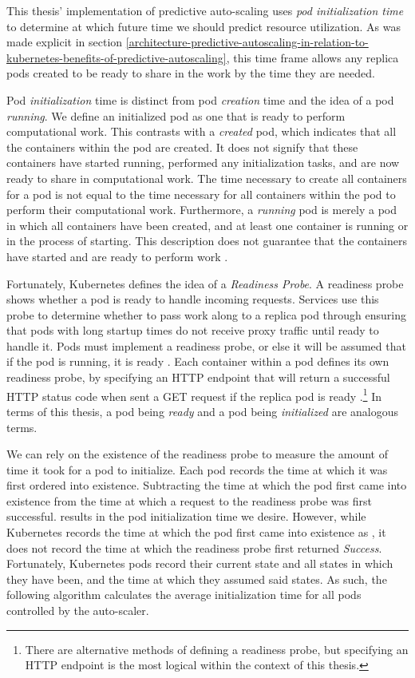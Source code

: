 This thesis' implementation of predictive auto-scaling uses \textit{pod
initialization time} to determine at which future time we should predict
resource utilization. As was made explicit in section
\ref{architecture-predictive-autoscaling-in-relation-to-kubernetes-benefits-of-predictive-autoscaling},
this time frame allows any replica pods created to be ready to share in the work by the
time they are needed.

Pod \textit{initialization} time is distinct from pod \textit{creation} time and
the idea of a pod \textit{running}. We define an initialized pod as one that is
ready to perform computational work. This contrasts with a \textit{created} pod,
which indicates that all the containers within the pod are created. It
does not signify that these containers have started running, performed any
initialization tasks, and are now ready to share in computational work. The time
necessary to create all containers for a pod is not equal to the time necessary
for all containers within the pod to perform their computational work.
Furthermore, a \textit{running} pod is merely a pod in which all containers have
been created, and at least one container is running or in the process of
starting. This description does not guarantee that the containers have started
and are ready to perform work \cite{k8s-pod-states}.

Fortunately, Kubernetes defines the idea of a \textit{Readiness Probe}. A
readiness probe shows whether a pod is ready to handle incoming requests.
Services use this probe to determine whether to pass work along to a
replica pod through ensuring that pods with long startup times do not
receive proxy traffic until ready to handle it. Pods must implement a readiness
probe, or else it will be assumed that if the pod is running, it is ready
\cite{k8s-pod-states}. Each container within a pod defines its own readiness
probe, by specifying an HTTP endpoint that will return a successful HTTP status
code when sent a GET request if the replica pod is ready
\cite{k8s-working-with-containers}.\footnote{There are alternative methods of
defining a readiness probe, but specifying an HTTP endpoint is the most logical
within the context of this thesis.} In terms of this thesis, a
pod being \textit{ready} and a pod being \textit{initialized} are analogous
terms.

We can rely on the existence of the readiness probe to
measure the amount of time it took for a pod
to initialize. Each pod records the time at which it was first ordered into
existence. Subtracting the time at which the pod first came into existence
from the time at which a request to the readiness probe was first successful.
results in the pod initialization time we desire. However, while Kubernetes
records the time at which the pod first came into existence as
, it does not record the time at which the
readiness probe first returned \textit{Success}. Fortunately, Kubernetes pods
record their current state and all states in which they have been, and the time
at which they assumed said states. As such, the following algorithm
calculates the average initialization time for all pods controlled by the auto-scaler.

